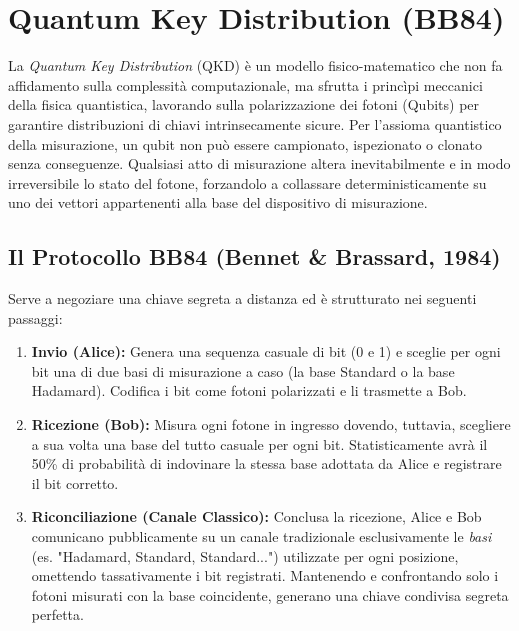 \documentclass[12pt, a4paper]{report}
\begin{document}
\section{Quantum Key Distribution (BB84)}
La \textit{Quantum Key Distribution} (QKD) è un modello fisico-matematico che non fa affidamento sulla complessità computazionale, ma sfrutta i princìpi meccanici della fisica quantistica, lavorando sulla polarizzazione dei fotoni (Qubits) per garantire distribuzioni di chiavi intrinsecamente sicure.
Per l'assioma quantistico della misurazione, un qubit non può essere campionato, ispezionato o clonato senza conseguenze. Qualsiasi atto di misurazione altera inevitabilmente e in modo irreversibile lo stato del fotone, forzandolo a collassare deterministicamente su uno dei vettori appartenenti alla base del dispositivo di misurazione.

\subsection{Il Protocollo BB84 (Bennet \& Brassard, 1984)}
Serve a negoziare una chiave segreta a distanza ed è strutturato nei seguenti passaggi:
\begin{enumerate}
	\item \textbf{Invio (Alice):} Genera una sequenza casuale di bit (0 e 1) e sceglie per ogni bit una di due basi di misurazione a caso (la base Standard o la base Hadamard). Codifica i bit come fotoni polarizzati e li trasmette a Bob.
	\item \textbf{Ricezione (Bob):} Misura ogni fotone in ingresso dovendo, tuttavia, scegliere a sua volta una base del tutto casuale per ogni bit. Statisticamente avrà il 50\% di probabilità di indovinare la stessa base adottata da Alice e registrare il bit corretto.
	\item \textbf{Riconciliazione (Canale Classico):} Conclusa la ricezione, Alice e Bob comunicano pubblicamente su un canale tradizionale esclusivamente le \textit{basi} (es. "Hadamard, Standard, Standard...") utilizzate per ogni posizione, omettendo tassativamente i bit registrati. Mantenendo e confrontando solo i fotoni misurati con la base coincidente, generano una chiave condivisa segreta perfetta.
\end{enumerate}
\end{document}
